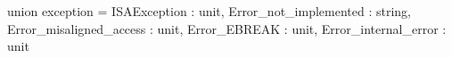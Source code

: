 union exception = {
  ISAException : unit,
  Error_not_implemented : string,
  Error_misaligned_access : unit,
  Error_EBREAK : unit,
  Error_internal_error : unit
}
